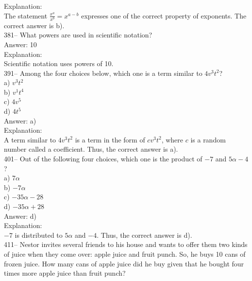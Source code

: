 \documentclass[letterpaper, 12pt]{article}
\begin{document}
Explanation: \\
The statement $\frac{x^{a}}{x^{b}}=x^{a-b}$
expresses one of the correct property of exponents.
The correct answer is b).\\


381-- What powers are used in scientific notation?\\

Answer: 10\\

Explanation: \\
Scientific notation uses powers of 10.\\


391-- Among the four choices below, which one is a term similar to
$4v^{3}t^{2}$?\\

a) $v^{3}t^{2}$\\
b) $v^{1}t^{4}$\\
c) $4v^{5}$\\
d) $4t^{5}$\\

Answer: a)\\

Explanation: \\
A term similar to $4v^{3}t^{2}$ is a term in the form of $cv^{3}t^{2}$,
where $c$ is a random number called a coefficient.
Thus, the correct answer is a).\\



401-- Out of the following four choices, which one is the product of $-7$ and $5\alpha-4$?\\

a) $7\alpha$\\
b) $-7\alpha$\\
c) $-35\alpha-28$\\
d) $-35\alpha+28$\\

Answer: d) \\

Explanation: \\
$-7$ is distributed to $5\alpha$ and $-4$.
Thus, the correct answer is d).\\




411-- Nestor invites several friends to his house and wants to offer them two kinds of juice when they come over: apple juice and fruit punch. So, he buys 10 cans of frozen juice. How many cans of apple juice did he buy given that he bought four times more apple juice than fruit punch? \\
\end{document}

